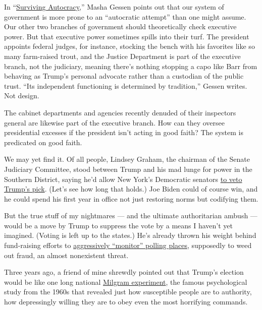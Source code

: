 In
``\href{https://www.nytimes3xbfgragh.onion/2020/06/03/books/review-surviving-autocracy-masha-gessen.html}{Surviving
Autocracy},'' Masha Gessen points out that our system of government is
more prone to an ``autocratic attempt'' than one might assume. Our other
two branches of government should theoretically check executive power.
But that executive power sometimes spills into their turf. The president
appoints federal judges, for instance, stocking the bench with his
favorites like so many farm-raised trout, and the Justice Department is
part of the executive branch, not the judiciary, meaning there's nothing
stopping a capo like Barr from behaving as Trump's personal advocate
rather than a custodian of the public trust. ``Its independent
functioning is determined by tradition,'' Gessen writes. Not design.

The cabinet departments and agencies recently denuded of their
inspectors general are likewise part of the executive branch. How can
they oversee presidential excesses if the president isn't acting in good
faith? The system is predicated on good faith.

We may yet find it. Of all people, Lindsey Graham, the chairman of the
Senate Judiciary Committee, stood between Trump and his mad lunge for
power in the Southern District, saying he'd allow New York's Democratic
senators
\href{https://www.axios.com/geoffrey-berman-lindsey-graham-new-york-attorney-a388fc90-69a9-42f5-933d-3f0fe558f9d2.html}{to
veto Trump's pick}. (Let's see how long that holds.) Joe Biden could of
course win, and he could spend his first year in office not just
restoring norms but codifying them.

But the true stuff of my nightmares --- and the ultimate authoritarian
ambush --- would be a move by Trump to suppress the vote by a means I
haven't yet imagined. (Voting is left up to the states.) He's already
thrown his weight behind fund-raising efforts to
\href{https://www.nytimes3xbfgragh.onion/2020/05/18/us/Voting-republicans-trump.html}{aggressively
``monitor'' polling places}, supposedly to weed out fraud, an almost
nonexistent threat.

Three years ago, a friend of mine shrewdly pointed out that Trump's
election would be like one long national
\href{https://www.simplypsychology.org/milgram.html}{Milgram
experiment}, the famous psychological study from the 1960s that revealed
just how susceptible people are to authority, how depressingly willing
they are to obey even the most horrifying commands.

